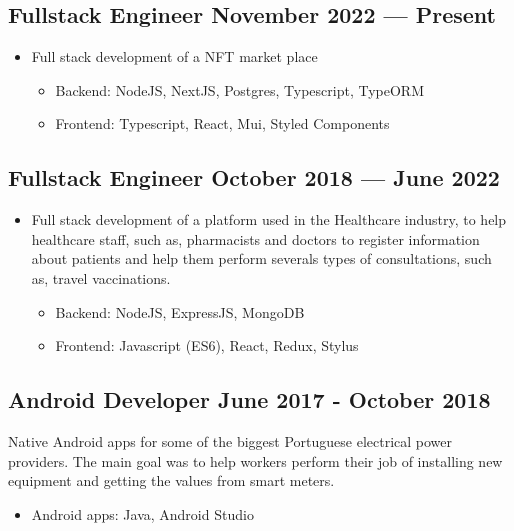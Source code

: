 
\subsection{{Fullstack Engineer \hfill November 2022 --- Present}}

\begin{itemize}
    \item Full stack development of a NFT market place
    \begin{itemize}
        \item Backend: NodeJS, NextJS, Postgres, Typescript, TypeORM
        \item Frontend: Typescript, React, Mui, Styled Components
    \end{itemize}
\end{itemize}

\subsection{{Fullstack Engineer \hfill October 2018 --- June 2022}}

\begin{itemize}
    \item Full stack development of a platform used in the Healthcare industry,
	to help healthcare staff, such as, pharmacists 
	and doctors to register information about patients and 
	help them perform severals types of consultations, 
	such as, travel vaccinations.
    \begin{itemize}
        \item Backend: NodeJS, ExpressJS, MongoDB
        \item Frontend: Javascript (ES6), React, Redux, Stylus
    \end{itemize}
\end{itemize}

\subsection{{Android Developer \hfill June 2017 - October 2018}}
\begin{zitemize}
\item Native Android apps for some of the biggest Portuguese 
electrical power providers. 
The main goal was to help workers perform their job of 
installing new equipment and getting the values 
from smart meters.
\begin{itemize}
    \item Android apps: Java, Android Studio
\end{itemize}
\end{zitemize}

